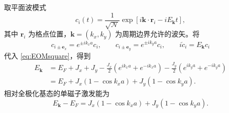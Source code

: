 \documentclass[UTF8,11pt,a4paper,fontset=fandol]{ctexart}
\begin{document}
取平面波模式
\begin{equation}
c_i(t)=\frac1{\sqrt{\mathcal N}}
\exp\!\left[i\mathbf k\cdot\mathbf r_i-iE_{\mathbf k}t\right],
\label{eq:planewave}
\end{equation}
其中 $\mathbf r_i$ 为格点位置，$\mathbf k=(k_x,k_y)$ 为周期边界允许的波矢。将
\begin{equation}
c_{i\pm\mathbf e_x}=e^{\pm ik_xa}c_i,\qquad
c_{i\pm\mathbf e_y}=e^{\pm ik_ya}c_i,\qquad
i\dot c_i=E_{\mathbf k}c_i
\end{equation}
代入 \eqref{eq:EOMsquare}，得到
\begin{equation}
\begin{aligned}
E_{\mathbf k}
&=E_F+J_x+J_y
-\frac{J_x}{2}(e^{ik_xa}+e^{-ik_xa})
-\frac{J_y}{2}(e^{ik_ya}+e^{-ik_ya})\\
&=E_F+J_x(1-\cos k_xa)+J_y(1-\cos k_ya).
\end{aligned}
\end{equation}
相对全极化基态的单磁子激发能为
\begin{equation}
\boxed{
E_{\mathbf k}-E_F
=J_x(1-\cos k_xa)+J_y(1-\cos k_ya).
}
\end{equation}
\end{document}
